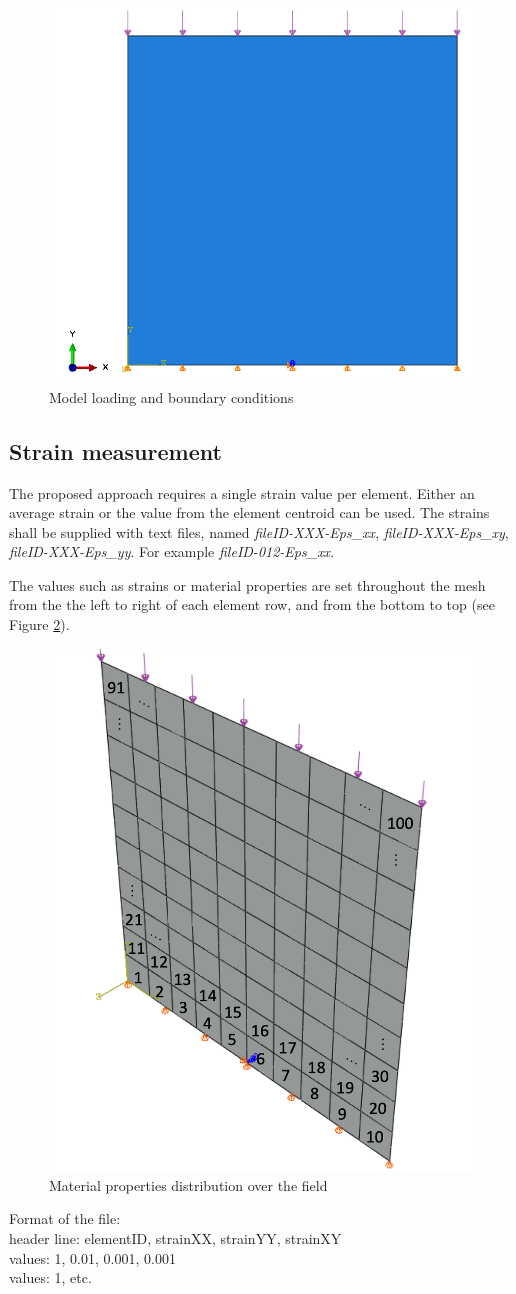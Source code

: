 \documentclass[preprint,12pt,3p]{elsarticle}
\begin{document}
\begin{figure} [H]
\centering
\includegraphics[width=0.40\linewidth]{images/Load_BC.png}
\caption{Model loading and boundary conditions}
 \label{fig:Load-BC}
\end{figure}

\subsection{Strain measurement}
The proposed approach requires a single strain value per element. Either an average strain or the value from the element centroid can be used. The strains shall be supplied with text files, named \textit{fileID-XXX-Eps\_xx}, \textit{fileID-XXX-Eps\_xy}, \textit{fileID-XXX-Eps\_yy}. For example \textit{fileID-012-Eps\_xx}.

The values such as strains or material properties are set throughout the mesh from the the left to right of each element row, and from the bottom to top  (see Figure \ref{fig:Elementsid}). 

\begin{figure} [H]
\centering
\includegraphics[width=0.40\linewidth]{images/Elements_id.png}
\caption{ Material properties distribution over the field}
 \label{fig:Elementsid}
\end{figure}

Format of the file: \\
header line: elementID, strainXX, strainYY, strainXY \\
values: 1, 0.01, 0.001, 0.001 \\
values: 1, etc.
\end{document}
